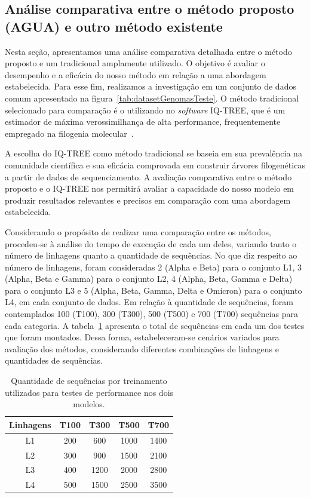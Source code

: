 \subsection{Análise comparativa entre o método proposto (AGUA) e outro método existente}
Nesta seção, apresentamos uma análise comparativa detalhada entre o método proposto e um tradicional amplamente utilizado. O objetivo é avaliar o desempenho e a eficácia do nosso método em relação a uma abordagem estabelecida. Para esse fim, realizamos a investigação em um conjunto de dados comum apresentado na figura~\ref{tab:datasetGenomasTeste}. O método tradicional selecionado para comparação é o utilizando no \textit{software} IQ-TREE, que é um estimador de máxima verossimilhança de alta performance, frequentemente empregado na filogenia molecular~\cite{iqtree2_minh_2020}.

A escolha do IQ-TREE como método tradicional se baseia em sua prevalência na comunidade científica e sua eficácia comprovada em construir árvores filogenéticas a partir de dados de sequenciamento. A avaliação comparativa entre o método proposto e o IQ-TREE nos permitirá avaliar a capacidade do nosso modelo em produzir resultados relevantes e precisos em comparação com uma abordagem estabelecida.

Considerando o propósito de realizar uma comparação entre os métodos, procedeu-se à análise do tempo de execução de cada um deles, variando tanto o número de linhagens quanto a quantidade de sequências. No que diz respeito ao número de linhagens, foram consideradas 2 (Alpha e Beta) para o conjunto L1, 3 (Alpha, Beta e Gamma) para o conjunto L2, 4 (Alpha, Beta, Gamma e Delta) para o conjunto L3 e 5 (Alpha, Beta, Gamma, Delta e Omicron) para o conjunto L4, em cada conjunto de dados. Em relação à quantidade de sequências, foram contemplados 100 (T100), 300 (T300), 500 (T500) e 700 (T700) sequências para cada categoria.
A tabela~\ref{tab:quantidadeSequenciasTeste} apresenta o total de sequências em cada um dos testes que foram montados.
Dessa forma, estabeleceram-se cenários variados para avaliação dos métodos, considerando diferentes combinações de linhagens e quantidades de sequências.

\begin{table}[htb]
  \caption{Quantidade de sequências por treinamento utilizados para testes de performance nos dois modelos.}
  \begin{center}
    \begin{tabular}{c|c|c|c|c}
      \hline
      Linhagens & T100 & T300 & T500 & T700 \\
      \hline
      L1        & 200  & 600  & 1000 & 1400 \\
      L2        & 300  & 900  & 1500 & 2100 \\
      L3        & 400  & 1200 & 2000 & 2800 \\
      L4        & 500  & 1500 & 2500 & 3500 \\
      \hline
    \end{tabular}
  \end{center}
  \label{tab:quantidadeSequenciasTeste}
\end{table}

